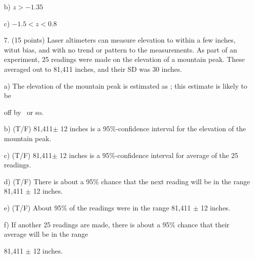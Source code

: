 \documentclass[10pt]{article}
\begin{document}
\hspace{10pt} b) $z>-1.35$
\bigskip
\bigskip\bigskip\bigskip

\hspace{10pt} c) $-1.5 < z < 0.8$
\bigskip\bigskip\bigskip\bigskip


\vfill
\eject

\newcommand{\BL}{\underbar{\hspace{.5in}}}
7. (15 points)
Laser altimeters can measure elevation to within a few inches, witut bias,
and with no trend or pattern to the measurements.
As part of an experiment, 25 readings were made on the elevation of a mountain peak.
These averaged out to 81,411 inches, and their SD was 30 inches. 
\bigskip
\bigskip

\hspace{20pt} a) The elevation of the mountain peak is estimated 
as \BL\BL; this estimate is likely to be\vspace{10pt}

\hspace{20pt}\hphantom{f) } off by \BL\BL\ or so.
\vspace{1.0in}

\hspace{20pt} b) (T/F) 81,411$\pm$ 12 inches is a 95\%-confidence interval for the elevation
of the mountain peak.
\vspace{1.0in}

\hspace{20pt} c) (T/F) 81,411$\pm$ 12 inches is a 95\%-confidence interval for 
average of the 25 readings.
\vspace{1.0in}

\hspace{20pt} d) (T/F) There is about a 95\% chance that the next reading will be in 
the range 81,411 $\pm$ 12 inches.
\vspace{1.0in}

\hspace{20pt} e) (T/F) About 95\% of the readings were in the range 81,411 $\pm$ 12 inches.
\vspace{1.0in}

\hspace{20pt} f) If another 25 readings are made, there is about a 95\% chance that their
average will be in the range\vspace{-4pt}

\hspace{20pt}\hphantom{f) } 81,411 $\pm$ 12 inches.


\vfill
\eject
\end{document}
